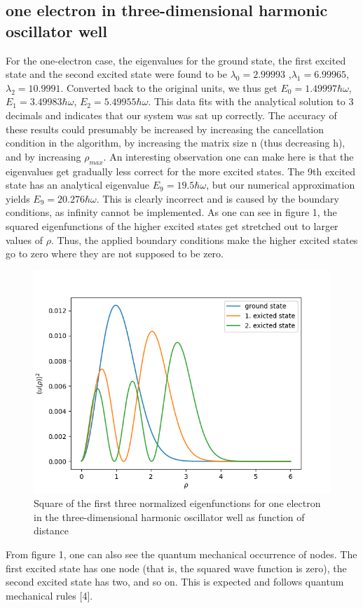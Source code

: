 \documentclass[10pt,a4paper]{article}
\begin{document}
\subsection{one electron in three-dimensional harmonic oscillator well}
For the one-electron case, the eigenvalues for the ground state, the first excited state and the second excited state were found to be $\lambda_0=2.99993$ ,$ \lambda_1=6.99965$,$\lambda_2=10.9991$. Converted back to the original units, we thus get $E_0=1.49997\hbar\omega$, $E_1=3.49983\hbar\omega$, $E_2=5.49955\hbar\omega$. This data fits with the analytical solution to 3 decimals and indicates that our system was sat up correctly. The accuracy of these results could presumably be increased by increasing the cancellation condition in the algorithm, by increasing the matrix size n (thus decreasing h), and by increasing $\rho_{max}$. An interesting observation one can make here is that the eigenvalues get gradually less correct for the more excited states. The 9th excited state has an analytical eigenvalue $E_9=19.5\hbar\omega$, but our numerical approximation yields  $E_9=20.276\hbar\omega$. This is clearly incorrect and is caused by the boundary conditions, as infinity cannot be implemented. As one can see in figure 1, the squared eigenfunctions of the higher excited states get stretched out to larger values of $\rho$. Thus, the applied boundary conditions make the higher excited states go to zero where they are not supposed to be zero.
\begin{figure}[H]
	\includegraphics[width =1.2\textwidth]{solutions_one_electron_1_000000.png}
	\caption[Eigenfunctions$^2$ for one electron]{Square of the first three normalized eigenfunctions for one electron in the three-dimensional harmonic oscillator well as function of distance}
\end{figure}
From figure 1, one can also see the quantum mechanical occurrence of nodes. The first excited state has one node (that is, the squared wave function is zero), the second excited state has two, and so on. This is expected and follows quantum mechanical rules [4].
 
\end{document}
